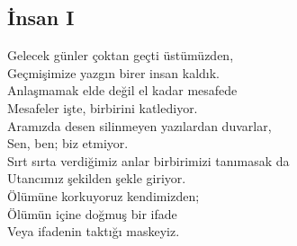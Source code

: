 \subsection{İnsan I}

Gelecek günler çoktan geçti üstümüzden, \\
Geçmişimize yazgın birer insan kaldık. \\
Anlaşmamak elde değil el kadar mesafede \\
Mesafeler işte, birbirini katlediyor. \\
Aramızda desen silinmeyen yazılardan duvarlar, \\
Sen, ben; biz etmiyor. \\

\noindent\newline
Sırt sırta verdiğimiz anlar birbirimizi tanımasak da \\
Utancımız şekilden şekle giriyor. \\
Ölümüne korkuyoruz kendimizden; \\
Ölümün içine doğmuş bir ifade \\
Veya ifadenin taktığı maskeyiz. \\